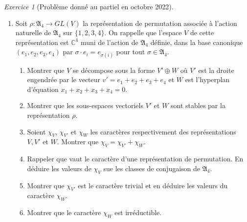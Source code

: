 \documentclass[french]{book}
\theoremstyle{definition}
\theoremstyle{remark}
\newtheorem{exo}{Exercice}
\begin{document}
\begin{exo}[Problème donné au partiel en octobre 2022]
\begin{enumerate}
    \item Soit \(\rho : \mathfrak{A}_{4} \longrightarrow GL(V)\) la représentation de permutation associée à l'action naturelle de \(\mathfrak{A}_{4}\) sur \(\{ 1, 2, 3, 4\}\). On rappelle que l'espace \(V\) de cette représentation est \(\mathbb{C}^{4}\) muni de l'action de \(\mathfrak{A}_{4}\) définie, dans la base canonique \((e_1, e_2, e_3, e_4)\) par \(\sigma \cdot e_i = e _{\sigma(i)}\) pour tout \(\sigma \in \mathfrak{A}_{4}\).
    \begin{enumerate}
      \item Montrer que \(V\) se décompose sous la forme \(V' \oplus W\) où \(V'\) est la droite engendrée par le vecteur \(v' = e_1 + e_2 + e_3 + e_4\) et \(W\) est l'hyperplan d'équation \(x_1 + x_2 + x_3 + x_4 = 0\).
      \item Montrer que les sous-espaces vectoriels \(V'\) et \(W\) sont stables par la représentation \(\rho\).
      \item Soient \(\chi_V\), \(\chi _{V'}\) et \(\chi_W\) les caractères respectivement des représentations \(V, V'\) et \(W\).
      Montrer que \(\chi_V = \chi _{V'}+ \chi _{W}\).
      \item Rappeler que vaut le caractère d'une représentation de permutation. En déduire les valeurs de \(\chi_V\) sue les classes de conjugaison de \(\mathfrak{A}_{4}\).
      \item Montrer que \(\chi _{V'}\) est le caractère trivial et en déduire les valeurs du caractère \(\chi_W\).
      \item Montrer que le caractère \(\chi_W\) est irréductible.
    \end{enumerate}
  \end{enumerate}
\end{exo}

\end{document}
